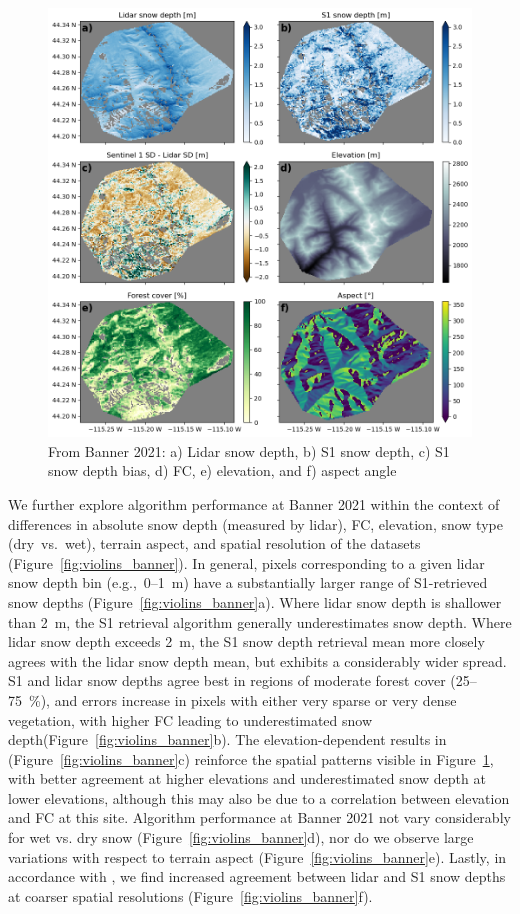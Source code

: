 \documentclass[journal abbreviation, manuscript]{copernicus}
\begin{document}
\begin{figure}[htbp]
    \centering
    \includegraphics[width=\textwidth]{figures/banner_map_results.png}
    \caption{From Banner 2021: a) Lidar snow depth, b) S1 snow depth, c) S1 snow depth bias, d) FC, e) elevation, and f) aspect angle}
    \label{fig:banner_maps}
\end{figure}

We further explore algorithm performance at Banner 2021 within the context of differences in absolute snow depth (measured by lidar), FC, elevation, snow type (dry~vs.~wet), terrain aspect, and spatial resolution of the datasets (Figure~\ref{fig:violins_banner}). In general, pixels corresponding to a given lidar snow depth bin (e.g.,~0--1~m) have a substantially larger range of S1-retrieved snow depths (Figure~\ref{fig:violins_banner}a). Where lidar snow depth is shallower than 2~m, the S1 retrieval algorithm generally underestimates snow depth. Where lidar snow depth exceeds 2~m, the S1 snow depth retrieval mean more closely agrees with the lidar snow depth mean, but exhibits a considerably wider spread. S1 and lidar snow depths agree best in regions of moderate forest cover (25--75~\%), and errors increase in pixels with either very sparse or very dense vegetation, with higher FC leading to underestimated snow depth(Figure~\ref{fig:violins_banner}b). The elevation-dependent results in (Figure~\ref{fig:violins_banner}c) reinforce the spatial patterns visible in Figure~\ref{fig:banner_maps}, with better agreement at higher elevations and underestimated snow depth at lower elevations, although this may also be due to a correlation between elevation and FC at this site. Algorithm performance at Banner 2021 not vary considerably for wet vs. dry snow (Figure~\ref{fig:violins_banner}d), nor do we observe large variations with respect to terrain aspect (Figure~\ref{fig:violins_banner}e). Lastly, in accordance with \citet{Lievens.2022}, we find increased agreement between lidar and S1 snow depths at coarser spatial resolutions (Figure~\ref{fig:violins_banner}f). 
\end{document}
